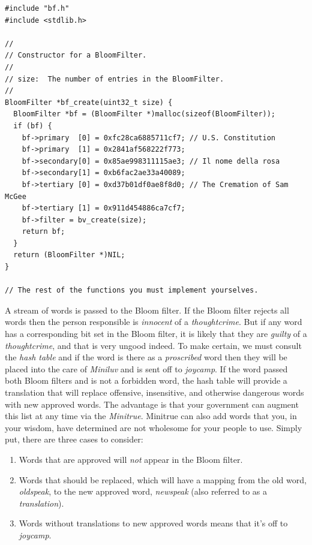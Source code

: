 \documentclass{article}
\begin{document}
\begin{lstlisting}[title=bf.c]
#include "bf.h"
#include <stdlib.h>

//
// Constructor for a BloomFilter.
//
// size:  The number of entries in the BloomFilter.
//
BloomFilter *bf_create(uint32_t size) {
  BloomFilter *bf = (BloomFilter *)malloc(sizeof(BloomFilter));
  if (bf) {
    bf->primary  [0] = 0xfc28ca6885711cf7; // U.S. Constitution
    bf->primary  [1] = 0x2841af568222f773;
    bf->secondary[0] = 0x85ae998311115ae3; // Il nome della rosa
    bf->secondary[1] = 0xb6fac2ae33a40089;
    bf->tertiary [0] = 0xd37b01df0ae8f8d0; // The Cremation of Sam McGee
    bf->tertiary [1] = 0x911d454886ca7cf7;
    bf->filter = bv_create(size);
    return bf;
  }
  return (BloomFilter *)NIL;
}

// The rest of the functions you must implement yourselves.
\end{lstlisting}

A stream of words is passed to the Bloom filter. If the Bloom filter rejects all
words then the person responsible is \emph{innocent} of a \emph{thoughtcrime}.
But if any word has a corresponding bit set in the Bloom filter, it is likely
that they are \emph{guilty} of a \emph{thoughtcrime}, and that is very ungood
indeed. To make certain, we must consult the \emph{hash table} and if the word
is there as a \emph{proscribed} word then they will be placed into the care of
\emph{Miniluv} and is sent off to \emph{joycamp}.  If the word passed both Bloom
filters and is not a forbidden word, the hash table will provide a translation
that will replace offensive, insensitive, and otherwise dangerous words with new
approved words. The advantage is that your government can augment this list at
any time via the \emph{Minitrue}. Minitrue can also add words that you, in your wisdom, have determined are not wholesome for your
people to use. Simply put, there are three cases to consider:

\begin{enumerate}
\item Words that are approved will \emph{not} appear in the Bloom filter.
\item Words that should be replaced, which will have a mapping from the old
    word, \emph{oldspeak}, to the new approved word, \emph{newspeak} (also
    referred to as a \emph{translation}).
\item Words without translations to new approved words means that it's
    off to \emph{joycamp}.
\end{enumerate}
\end{document}
